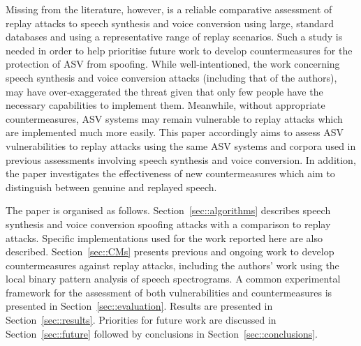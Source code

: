 Missing from the literature, however, is a reliable comparative assessment 
of replay attacks to speech synthesis and voice conversion using large, 
standard databases and using a representative range of replay scenarios. 
Such a study is needed in order to help prioritise future work to develop
countermeasures for the protection of ASV from spoofing.
While well-intentioned, the work concerning speech synthesis and voice conversion attacks 
(including that of the authors), may have over-exaggerated the threat given that
only few people have the necessary capabilities to implement them.  Meanwhile, 
without appropriate countermeasures, ASV systems may remain vulnerable to replay 
attacks which are implemented much more easily. 
This paper accordingly aims to assess ASV vulnerabilities 
to replay attacks using the same ASV systems and corpora used in 
previous assessments involving speech synthesis and voice conversion.  In addition, the paper investigates the effectiveness of 
new countermeasures which aim to distinguish between genuine and replayed speech. 


The paper is organised as follows.  Section~\ref{sec::algorithms} describes speech synthesis and voice conversion spoofing attacks with a comparison to replay attacks. Specific implementations used for the work reported here are also described. Section~\ref{sec::CMs} presents previous and ongoing work to develop countermeasures against replay attacks, including the authors' work using the local binary pattern analysis of speech spectrograms.  A common experimental framework for the assessment of both vulnerabilities and countermeasures is presented in Section~\ref{sec::evaluation}. Results are presented in Section~\ref{sec::results}.  Priorities for future work are discussed in Section~\ref{sec::future} followed by conclusions in Section~\ref{sec::conclusions}.
